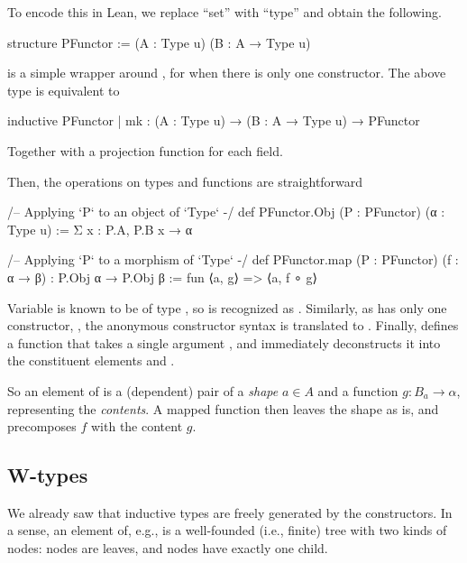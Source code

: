 To encode this in Lean, we replace ``set'' with ``type'' and obtain the following.
\begin{leancode}
    structure PFunctor := (A : Type u) (B : A → Type u)
\end{leancode}

\begin{remark}
     is a simple wrapper around \inductive, for when there is only one constructor.
    The above type is equivalent to
    \begin{leancode}
        inductive PFunctor 
        | mk : (A : Type u) → (B : A → Type u) → PFunctor
    \end{leancode}
    Together with a projection function for each field.
\end{remark}

Then, the operations on types and functions are straightforward
\begin{leancode}
    /-- Applying `P` to an object of `Type` -/
    def PFunctor.Obj (P : PFunctor) (α : Type u)
        := Σ x : P.A, P.B x → α

    /-- Applying `P` to a morphism of `Type` -/
    def PFunctor.map (P : PFunctor) (f : α → β) : P.Obj α → P.Obj β 
        := fun ⟨a, g⟩ => ⟨a, f ∘ g⟩
\end{leancode}

\begin{remark}
    Variable  is known to be of type , so  is recognized as . Similarly, as  has only one constructor, , the anonymous constructor syntax  is translated to .
    Finally,  defines a function that takes a single argument , and immediately deconstructs it into the constituent elements  and .
\end{remark}

So an element of  is a (dependent) pair of a \emph{shape} $a ∈ A$ and a function $g : B_a \rightarrow \alpha$, representing the \emph{contents}. A mapped function  then leaves the shape as is, and precomposes $f$ with the content $g$.

\subsection*{W-types}
We already saw that inductive types are freely generated by the constructors. In a sense, an element of, e.g.,  is a well-founded (i.e., finite) tree with two kinds of nodes:  nodes are leaves, and  nodes have exactly one child.

